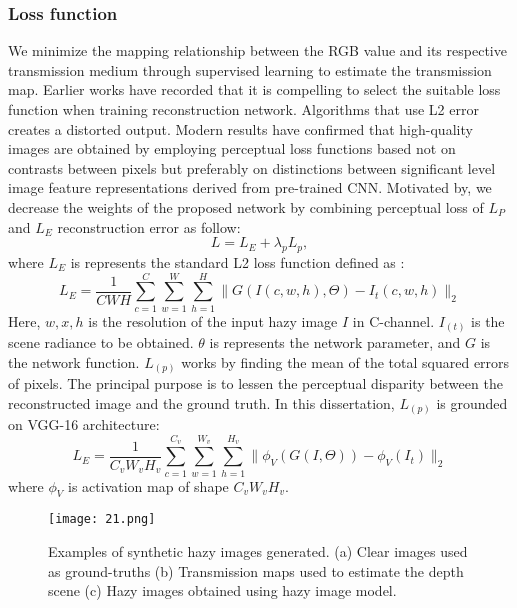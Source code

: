 \documentclass[doctor,english,listoffigures,listoftables]{thesis-uestc}
\begin{document}
\subsubsection{Loss function }
We minimize the mapping relationship between the RGB value and its respective transmission medium through supervised learning to estimate the transmission map. Earlier works have recorded that it is compelling to select the suitable loss function when training reconstruction network. Algorithms that use L2 error creates a distorted output. Modern results have confirmed that high-quality images are obtained by employing perceptual loss functions based not on contrasts between pixels but preferably on distinctions between significant level image feature representations derived from pre-trained CNN. Motivated by, we decrease the weights of the proposed network  by combining perceptual loss of $L_P$ and $L_E$ reconstruction error as follow:
\begin{equation}
	L=L_E +\lambda_pL_p,
\end{equation}
where $L_E$ is represents the standard L2 loss function defined as :
\begin{equation}
	L_E= \frac{1}{CWH}\sum_{c=1}^C \sum_{w=1}^W\sum_{h=1}^H \big\| G(I(c,w,h),\Theta ) -I_t(c,w,h) \big\|_2
\end{equation}
Here, $w, x, h$ is the resolution of the input hazy image $I$ in C-channel. $I_{(t)}$ is the scene radiance to be obtained. $\theta$ is represents the network parameter, and $G$ is the network function. $L_{(p)}$ works by finding the mean of the total squared errors of pixels. The principal purpose is to lessen the perceptual disparity between the reconstructed image and the ground truth. In this dissertation, $L_{(p)}$ is grounded on VGG-16 architecture:
\begin{equation}
	L_E= \frac{1}{C_v W_v H_v}\sum_{c=1}^{C_v}\sum_{w=1}^{W_v}\sum_{h=1}^{H_v} \big\| \phi_V(G(I,\Theta )) -\phi_V(I_t) \big\|_2
\end{equation}
where $\phi_V$ is activation map of shape ${C_v}{W_v}{H_v} $. 
\begin{figure}[H]
\begin{center}
\texttt{[image: 21.png]}
\caption{Examples of synthetic hazy images generated. (a) Clear images used as ground-truths (b) Transmission maps used to estimate the depth scene  (c) Hazy images  obtained using hazy image model.}
\label{fig:7}
\end{center}
\end{figure}
\end{document}
